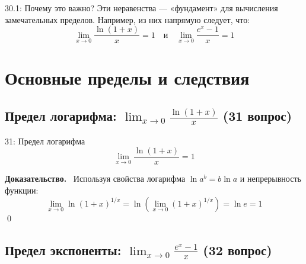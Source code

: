 \documentclass[a4paper,12pt]{article}
\newcommand{\tsubsection}[2]{\subsection[#1]{\texorpdfstring{#2}{#1}}}
\newcommand{\myproof}{\textbf{Доказательство.}\ }
\begin{document}
	\begin{center}
	\end{center}
	
	\vspace{0.5cm}
	\begin{notebook}{30.1: Почему это важно?}
		Эти неравенства — «фундамент» для вычисления замечательных пределов. Например, из них напрямую следует, что:
		\[ \lim_{x \to 0} \frac{\ln(1+x)}{x} = 1 \quad \text{и} \quad \lim_{x \to 0} \frac{e^x - 1}{x} = 1 \]
	\end{notebook}
	
	
	
	
	
	
	
	
	\newpage
	\section{Основные пределы и следствия}
	
	\tsubsection{Предел логарифма (31 вопрос)}{Предел логарифма: $\lim_{x \rightarrow 0} \frac{\ln (1+x)}{x}$ (31 вопрос)}
	
	\begin{theorembox}{31: Предел логарифма}
		\[ \lim_{x \rightarrow 0} \frac{\ln (1+x)}{x} = 1 \]
	\end{theorembox}
	
	\myproof
	Используя свойства логарифма $\ln a^b = b \ln a$ и непрерывность функции:
	\[ \lim_{x \rightarrow 0} \ln(1+x)^{1/x} = \ln \left( \lim_{x \rightarrow 0} (1+x)^{1/x} \right) = \ln e = 1 \] \qed
	
	
	\vspace{1cm}
	\tsubsection{Предел экспоненты (32 вопрос)}{Предел экспоненты: $\lim_{x \rightarrow 0} \frac{e^x - 1}{x}$ (32 вопрос)}
	
\end{document}
